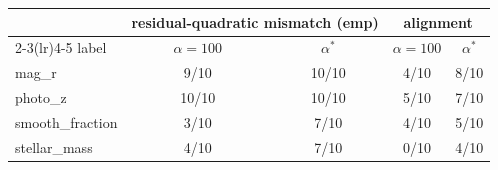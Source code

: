 \begin{tabular}{lcccc}
\toprule
 & \multicolumn{2}{c}{residual-quadratic mismatch (emp)} & \multicolumn{2}{c}{alignment} \\
\cmidrule(lr){2-3}\cmidrule(lr){4-5}
label & $\alpha=100$ & $\alpha^*$ & $\alpha=100$ & $\alpha^*$ \\
\midrule
mag\_r & 9/10 & 10/10 & 4/10 & 8/10 \\
photo\_z & 10/10 & 10/10 & 5/10 & 7/10 \\
smooth\_fraction & 3/10 & 7/10 & 4/10 & 5/10 \\
stellar\_mass & 4/10 & 7/10 & 0/10 & 4/10 \\
\bottomrule
\end{tabular}
